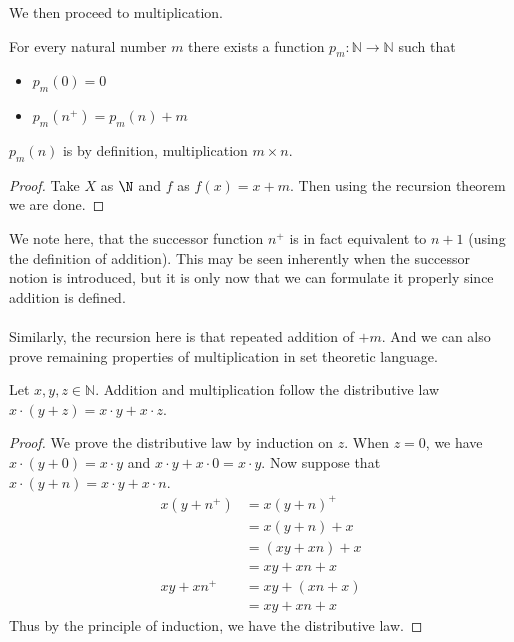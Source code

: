 We then proceed to multiplication. 

\begin{prp}{}{} For every natural number $m$ there exists a function $p_m:\mathbb{N}\to\mathbb{N}$ such that 
\begin{itemize}
\item $p_m(0)=0$
\item $p_m(n^+)=p_m(n)+m$
\end{itemize}
$p_m(n)$ is by definition, multiplication $m\times n$. \tcbline
\begin{proof}
Take $X$ as $\N$ and $f$ as $f(x)=x+m$. Then using the recursion theorem we are done. 
\end{proof}
\end{prp}

We note here, that the successor function $n^+$ is in fact equivalent to $n+1$ (using the definition of addition). This may be seen inherently when the successor notion is introduced, but it is only now that we can formulate it properly since addition is defined. \\~\\
Similarly, the recursion here is that repeated addition of $+m$. And we can also prove remaining properties of multiplication in set theoretic language. 

\begin{prp}{}{} Let $x,y,z\in\mathbb{N}$. Addition and multiplication follow the distributive law $x\cdot(y+z)=x\cdot y+x\cdot z$. \tcbline
\begin{proof} We prove the distributive law by induction on $z$. When $z=0$, we have $x\cdot(y+0)=x\cdot y$ and $x\cdot y+x\cdot 0=x\cdot y$. Now suppose that $x\cdot(y+n)=x\cdot y+x\cdot n$. 
\begin{align*}
x(y+n^+)&=x(y+n)^+ \tag{Definition of Addition}\\
&=x(y+n)+x \tag{Definition of Multiplication}\\
&=(xy+xn)+x \tag{Induction Hypothesis}\\
&=xy+xn+x \tag{Associativity of Addition}\\
xy+xn^+&=xy+(xn+x) \tag{Definition of Multiplication}\\
&=xy+xn+x \tag{Associativity of Addition}
\end{align*}
Thus by the principle of induction, we have the distributive law. 
\end{proof}
\end{prp}


